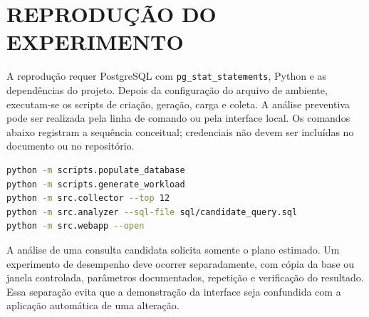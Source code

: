 \documentclass{UNESC}
\newcommand{\codigo}[1]{\texttt{#1}}
\begin{document}
\section{REPRODUÇÃO DO EXPERIMENTO}

A reprodução requer PostgreSQL com \codigo{pg\_stat\_statements}, Python e as dependências do projeto. Depois da configuração do arquivo de ambiente, executam-se os scripts de criação, geração, carga e coleta. A análise preventiva pode ser realizada pela linha de comando ou pela interface local. Os comandos abaixo registram a sequência conceitual; credenciais não devem ser incluídas no documento ou no repositório.

\begin{lstlisting}[language=bash,caption={Sequência de reprodução pela linha de comando}]
python -m scripts.populate_database
python -m scripts.generate_workload
python -m src.collector --top 12
python -m src.analyzer --sql-file sql/candidate_query.sql
python -m src.webapp --open
\end{lstlisting}

A análise de uma consulta candidata solicita somente o plano estimado. Um experimento de desempenho deve ocorrer separadamente, com cópia da base ou janela controlada, parâmetros documentados, repetição e verificação do resultado. Essa separação evita que a demonstração da interface seja confundida com a aplicação automática de uma alteração.


\renewcommand{\refname}{REFERÊNCIAS}

\end{document}
